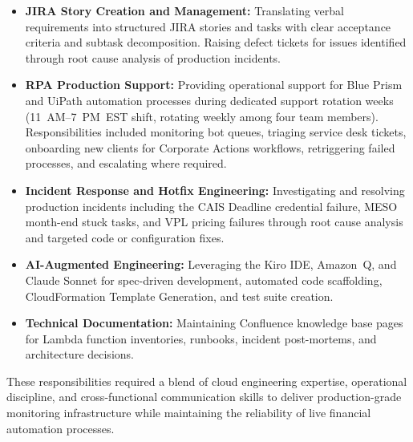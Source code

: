 \begin{itemize}
    \item \textbf{JIRA Story Creation and Management:} Translating verbal
          requirements into structured JIRA stories and tasks with clear
          acceptance criteria and subtask decomposition. Raising defect tickets
          for issues identified through root cause analysis of production incidents.

    \item \textbf{RPA Production Support:} Providing operational support for
          Blue Prism and UiPath automation processes during dedicated support
          rotation weeks (11~AM--7~PM~EST shift, rotating weekly among four team members).
          Responsibilities included monitoring bot queues, triaging service desk
          tickets, onboarding new clients for Corporate Actions workflows,
          retriggering failed processes, and escalating where required.

    \item \textbf{Incident Response and Hotfix Engineering:} Investigating and
          resolving production incidents including the CAIS Deadline credential
          failure, MESO month-end stuck tasks, and VPL
          pricing failures through root cause analysis and
          targeted code or configuration fixes.

    \item \textbf{AI-Augmented Engineering:} Leveraging the Kiro IDE, Amazon~Q, and
          Claude Sonnet for spec-driven development, automated code scaffolding,
          CloudFormation Template Generation, and test suite creation.

    \item \textbf{Technical Documentation:} Maintaining Confluence knowledge base
          pages for Lambda function inventories, runbooks, incident post-mortems, and
          architecture decisions.
\end{itemize}

These responsibilities required a blend of cloud engineering expertise, operational
discipline, and cross-functional communication skills to deliver production-grade
monitoring infrastructure while maintaining the reliability of live financial
automation processes.
